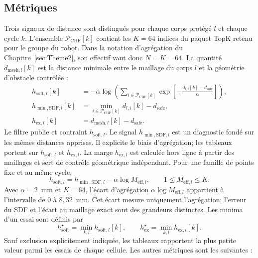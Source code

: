 \subsection{Métriques}\label{subsec:res_metriques}
Trois signaux de distance sont distingués pour chaque corps protégé $l$ et chaque cycle $k$. L'ensemble $\mathcal{P}_{\mathrm{CBF}}[k]$ contient les $K=64$ indices du paquet TopK retenu pour le groupe du robot. Dans la notation d'agrégation du Chapitre~\ref{sec:Theme2}, son effectif vaut donc $N=K=64$. La quantité $d_{\mathrm{mesh},l}[k]$ est la distance minimale entre le maillage du corps $l$ et la géométrie d'obstacle contrôlée :
\begin{align}
h_{\mathrm{soft},l}[k]
&=-\alpha\log\!\left(\sum_{i\in\mathcal{P}_{\mathrm{CBF}}[k]}
\exp\!\left[-\frac{d_{l,i}[k]-d_{\mathrm{safe}}}{\alpha}\right]\right),
\label{eq:res_hsoft}\\
h_{\min,\mathrm{SDF},l}[k]
&=\min_{i\in\mathcal{P}_{\mathrm{CBF}}[k]} d_{l,i}[k]-d_{\mathrm{safe}},
\label{eq:res_hminsdf}\\
h_{\mathrm{ex},l}[k]
&=d_{\mathrm{mesh},l}[k]-d_{\mathrm{safe}}.
\label{eq:res_hex}
\end{align}
Le filtre publie et contraint $h_{\mathrm{soft},l}$. Le signal $h_{\min,\mathrm{SDF},l}$ est un diagnostic fondé sur les mêmes distances apprises. Il explicite le biais d'agrégation; les tableaux portent sur $h_{\mathrm{soft},l}$ et $h_{\mathrm{ex},l}$. La marge $h_{\mathrm{ex},l}$ est calculée hors ligne à partir des maillages et sert de contrôle géométrique indépendant. Pour une famille de points fixe et au même cycle,
\begin{equation}
h_{\mathrm{soft},l}=h_{\min,\mathrm{SDF},l}-\alpha\log M_{\mathrm{eff},l},
\qquad 1\leq M_{\mathrm{eff},l}\leq K.
\label{eq:res_soft_gap}
\end{equation}
Avec $\alpha=2$~mm et $K=64$, l'écart d'agrégation $\alpha\log M_{\mathrm{eff},l}$ appartient à l'intervalle de $0$ à $8{,}32$~mm. Cet écart mesure uniquement l'agrégation; l'erreur du \ac{SDF} et l'écart au maillage exact sont des grandeurs distinctes. Les minima d'un essai sont définis par
\begin{equation}
h_{\mathrm{soft}}^\star=\min_{k,l}h_{\mathrm{soft},l}[k],\qquad
h_{\mathrm{ex}}^\star=\min_{k,l}h_{\mathrm{ex},l}[k].
\label{eq:res_episode_minima}
\end{equation}
Sauf exclusion explicitement indiquée, les tableaux rapportent la plus petite valeur parmi les essais de chaque cellule. Les autres métriques sont les suivantes :
